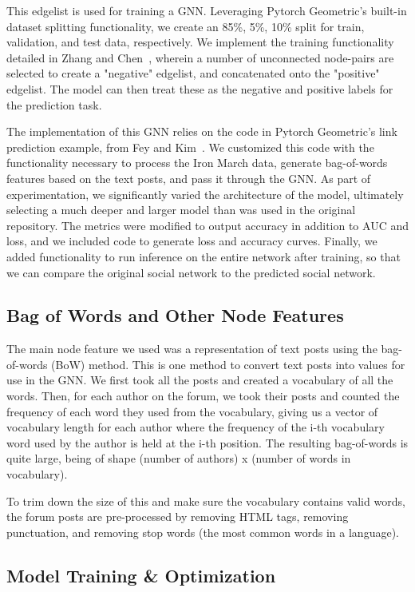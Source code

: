 \documentclass[10pt,twocolumn,letterpaper]{article}
\begin{document}
This edgelist is used for training a GNN. Leveraging Pytorch Geometric's built-in dataset splitting functionality, we create an 85\%, 5\%, 10\% split for train, validation, and test data, respectively. We implement the training functionality detailed in Zhang and Chen~\cite{SEAL}, wherein a number of unconnected node-pairs are selected to create a "negative" edgelist, and concatenated onto the "positive" edgelist. The model can then treat these as the negative and positive labels for the prediction task. 

The implementation of this GNN relies on the code in Pytorch Geometric's link prediction example, from Fey and Kim~\cite{pytorch-geometric}. We customized this code with the functionality necessary to process the Iron March data, generate bag-of-words features based on the text posts, and pass it through the GNN. As part of experimentation, we significantly varied the architecture of the model, ultimately selecting a much deeper and larger model than was used in the original repository. The metrics were modified to output accuracy in addition to AUC and loss, and we included code to generate loss and accuracy curves. Finally, we added functionality to run inference on the entire network after training, so that we can compare the original social network to the predicted social network.

\subsection{Bag of Words and Other Node Features}

The main node feature we used was a representation of text posts using the bag-of-words (BoW) method. This is one method to convert text posts into values for use in the GNN. We first took all the posts and created a vocabulary of all the words. Then, for each author on the forum, we took their posts and counted the frequency of each word they used from the vocabulary, giving us a vector of vocabulary length for each author where the frequency of the i-th vocabulary word used by the author is held at the i-th position. The resulting bag-of-words is quite large, being of shape (number of authors) x (number of words in vocabulary). 

To trim down the size of this and make sure the vocabulary contains valid words, the forum posts are pre-processed by removing HTML tags, removing punctuation, and removing stop words (the most common words in a language).

\subsection{Model Training \& Optimization}
\end{document}
